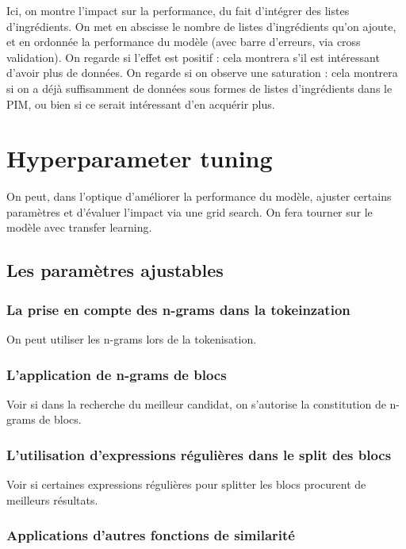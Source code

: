         Ici, on montre l'impact sur la performance, du fait d'intégrer des listes d'ingrédients.
        On met en abscisse le nombre de listes d'ingrédients qu'on ajoute, et en ordonnée la performance du modèle (avec barre d'erreurs, via cross validation).
        On regarde si l'effet est positif : cela montrera s'il est intéressant d'avoir plus de données.
        On regarde si on observe une saturation : cela montrera si on a déjà suffisamment de données sous formes de listes d'ingrédients dans le PIM, ou bien si ce serait intéressant d'en acquérir plus.

    \chapter{Hyperparameter tuning}
            
    On peut, dans l'optique d'améliorer la performance du modèle, ajuster certains paramètres et d'évaluer l'impact via une grid search.
    On fera tourner sur le modèle avec transfer learning.

        \section{Les paramètres ajustables}

            \subsection{La prise en compte des \og n-grams \fg dans la tokeinzation}

            On peut utiliser les n-grams lors de la tokenisation.

            \subsection{L'application de \og n-grams \fg de blocs}

            Voir si dans la recherche du meilleur candidat, on s'autorise la constitution de \og n-grams \fg de blocs.

            \subsection{L'utilisation d'expressions régulières dans le split des blocs}

            Voir si certaines expressions régulières pour splitter les blocs procurent de meilleurs résultats.

            \subsection{Applications d'autres fonctions de similarité}

